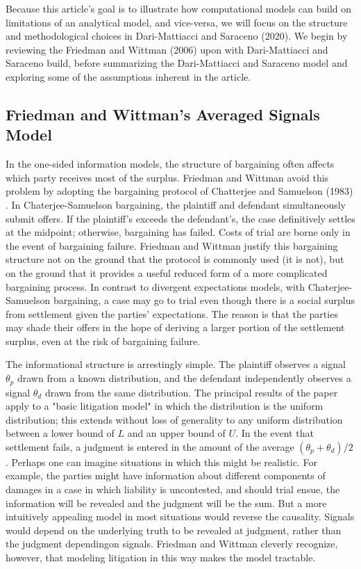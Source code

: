 \documentclass{article}
\begin{document}
Because this article's goal is to illustrate how computational models can build on limitations of an analytical model, and vice-versa, we will focus on the structure and methodological choices in Dari-Mattiacci and Saraceno (2020). We begin by reviewing the Friedman and Wittman (2006) \cite{friedmanwittman} upon with Dari-Mattiacci and Saraceno build, before summarizing the Dari-Mattiacci and Saraceno model and exploring some of the assumptions inherent in the article.

\subsection{Friedman and Wittman's Averaged Signals Model}

In the one-sided information models, the structure of bargaining often affects which party receives most of the surplus. Friedman and Wittman avoid this problem by adopting the bargaining protocol of Chatterjee and Samuelson (1983) \cite{chatterjeesamuelson}. In Chaterjee-Samuelson bargaining, the plaintiff and defendant simultaneously submit offers. If the plaintiff's exceeds the defendant's, the case definitively settles at the midpoint; otherwise, bargaining has failed. Costs of trial are borne only in the event of bargaining failure.  Friedman and Wittman justify this bargaining structure not on the ground that the protocol is commonly used (it is not), but on the ground that it provides a useful reduced form of a more complicated bargaining process.  In contrast to divergent expectations models, with Chaterjee-Samuelson bargaining, a case may go to trial even though there is a social surplus from settlement given the parties' expectations. The reason is that the parties may shade their offers in the hope of deriving a larger portion of the settlement surplus, even at the risk of bargaining failure.

The informational structure is arrestingly simple. The plaintiff observes a signal $\theta_p$ drawn from a known distribution, and the defendant independently observes a signal $\theta_d$ drawn from the same distribution. The principal results of the paper apply to a "basic litigation model" in which the distribution is the uniform distribution; this extends without loss of generality to any uniform distribution between a lower bound of $L$ and an upper bound of $U$. In the event that settlement fails, a judgment is entered in the amount of the average $(\theta_p + \theta_d)/2$. Perhaps one can imagine situations in which this might be realistic. For example, the parties might have information about different components of damages in a case in which liability is uncontested, and should trial ensue, the information will be revealed and the judgment will be the sum. But a more intuitively appealing model in most situations would reverse the causality. Signals would depend on the underlying truth to be revealed at judgment, rather than the judgment dependingon signals. Friedman and Wittman cleverly recognize, however, that modeling litigation in this way makes the model tractable.
\end{document}
